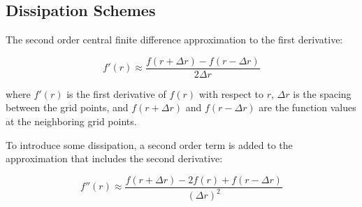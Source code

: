 \documentclass[a4paper]{report}
\begin{document}
%
%
%
%
%
%

\subsection{Dissipation Schemes}
The second order central finite difference approximation to the first derivative:

\begin{equation}
    f'(r) \approx \frac{f(r + \Delta r) - f(r - \Delta r)}{2 \Delta r}
\end{equation}

where $f'(r)$ is the first derivative of $f(r)$ with respect to $r$, $\Delta r$
is the spacing between the grid points, and $f(r + \Delta r)$ and $f(r - \Delta r)$ are the function values at the neighboring grid points.

To introduce some dissipation, a second order term is added to the approximation that includes the second derivative:

\begin{equation}
    f''(r) \approx \frac{f(r + \Delta r) - 2f(r) + f(r - \Delta r)}{(\Delta r)^2}
\end{equation}
\end{document}
